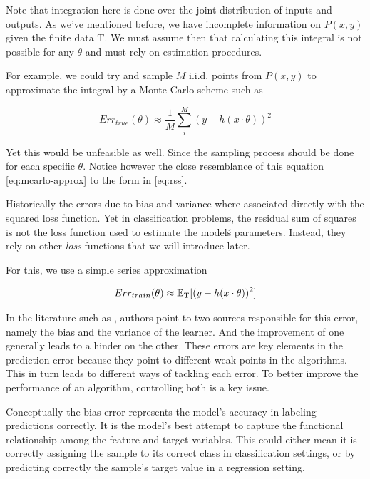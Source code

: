 Note that integration here is done over the joint distribution of inputs and outputs. As we've mentioned before, we have incomplete information on $P(x,y)$ given the finite data $ \mathrm{T}$.
We must assume then that calculating this integral is not possible for any $\theta$ and must rely on estimation procedures.

For example, we could try and sample $M$ i.i.d. points from $P(x,y)$ to approximate the integral by a Monte Carlo scheme such as

\begin{equation} \label{eq:mcarlo-approx}
Err_{true}(\theta) \approx \frac{1}{M} \sum_i^M ( y - h(x \cdot \theta) )^2
\end{equation}

Yet this would be unfeasible as well. Since the sampling process should be done for each specific $\theta$. Notice however the close resemblance of this equation \cref{eq:mcarlo-approx} to the form in \cref{eq:rss}.

Historically the errors due to bias and variance where associated directly with the squared loss function.  Yet in classification problems, the residual sum of squares is not the loss function used to estimate the model\'s parameters. Instead, they rely on other \textit{loss} functions that we will introduce later.

For this, we use a simple series approximation

\begin{equation}
Err_{train}(\theta) \approx  \operatorname{\mathbb{E}}_{ \mathrm{T}}[(y - h(x \cdot \theta) )^2]
\end{equation}




In the literature such as \textcite{james-biasVarianceGeneral}, authors point to two sources responsible for this error, namely the bias and the variance of the learner. And the improvement of one generally leads to a hinder on the other. These errors are key elements in the prediction error because they point to different weak points in the algorithms. This in turn leads to different ways of tackling each error. To better improve the performance of an algorithm, controlling both is a key issue.

Conceptually the bias error represents the model's accuracy in labeling predictions correctly. It is the model's best attempt to capture the functional relationship among the feature and target variables. This could either mean it is correctly assigning the sample to its correct class in classification settings, or by predicting correctly the sample's target value in a regression setting. 

